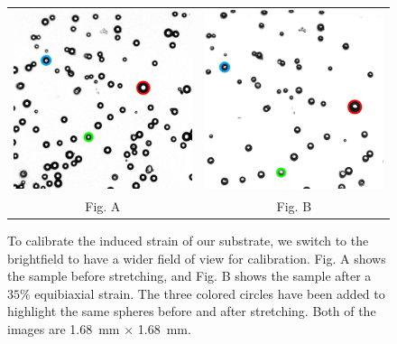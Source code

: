 \begin{figure}[h!]
	\begin{tabular}{cc}
		\includegraphics[width= .48\linewidth,frame]{Chapters/Figures/181115_unstretched_b_thesis_contrast_RGB.pdf} & \includegraphics[width= .48\linewidth,frame]{Chapters/Figures/181115_stretched_thesis_contrast_RGB.pdf}\\
		Fig. A & Fig. B
	\end{tabular}
	\caption[Bright-field stretch calibration images]{To calibrate the induced strain of our substrate, we switch to the brightfield to have a wider field of view for calibration. Fig. A shows the sample before stretching, and Fig. B shows the sample after a $ 35\% $ equibiaxial strain. The three colored circles have been added to highlight the same spheres before and after stretching. Both of the images are 1.68~mm $ \times $ 1.68~mm.}
		\label{fig:TDpreandpost}
\end{figure}

